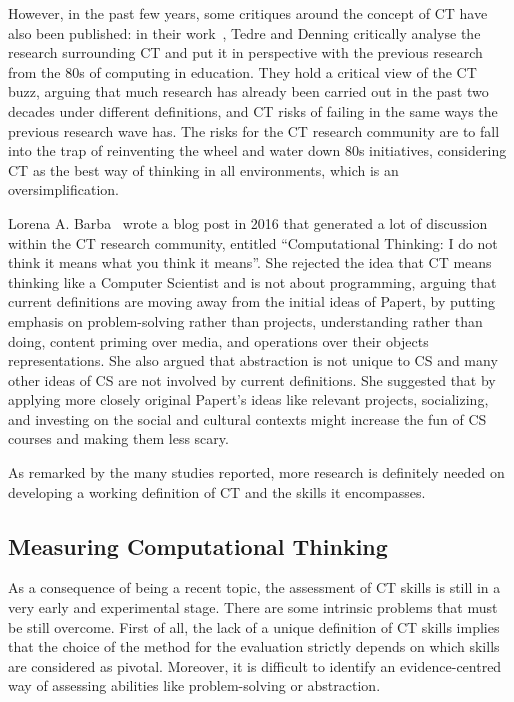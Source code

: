 However, in the past few years, some critiques around the concept of \ac{CT} have also been published: in their work~\cite{tedre2016long}, Tedre and Denning critically analyse the research surrounding \ac{CT} and put it in perspective with the previous research from the 80s of computing in education. They hold a critical view of the \ac{CT} buzz, arguing that much research has already been carried out in the past two decades under different definitions, and \ac{CT} risks of failing in the same ways the previous research wave has. The risks for the \ac{CT} research community are to fall into the trap of reinventing the wheel and water down 80s initiatives, considering \ac{CT} as the best way of thinking in all environments, which is an oversimplification.

Lorena A. Barba~\cite{CTLAB2016} wrote a blog post in 2016 that generated a lot of discussion within the \ac{CT} research community, entitled ``Computational Thinking: I do not think it means what you think it means''. She rejected the idea that \ac{CT} means thinking like a Computer Scientist and is not about programming, arguing that current definitions are moving away from the initial ideas of Papert, by putting emphasis on problem-solving rather than projects, understanding rather than doing, content priming over media, and operations over their objects representations. She also argued that abstraction is not unique to \ac{CS} and many other ideas of CS are not involved by current definitions. She suggested that by applying more closely original Papert's ideas like relevant projects, socializing, and investing on the social and cultural contexts might increase the fun of CS courses and making them less scary.

As remarked by the many studies reported, more research is definitely needed on developing a working definition of \ac{CT} and the skills it encompasses.

\subsection{Measuring Computational Thinking}
As a consequence of being a recent topic, the assessment of \ac{CT} skills is still in a very early and experimental stage. There are some intrinsic problems that must be still overcome. First of all, the lack of a unique definition of \ac{CT} skills implies that the choice of the method for the evaluation strictly depends on which skills are considered as pivotal. Moreover, it is difficult to identify an evidence-centred way of assessing abilities like problem-solving or abstraction.

